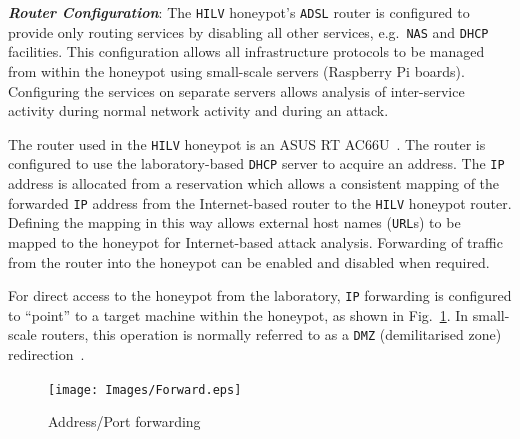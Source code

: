 \documentclass[10pt,journal]{IEEEtran}
\begin{document}
\noindent\textit{\textbf{Router Configuration}}:
The \texttt{HILV} honeypot's \texttt{ADSL} router is configured to provide only
routing services by disabling all other services, e.g.\ \texttt{NAS} and
\texttt{DHCP} facilities. This configuration allows all infrastructure
protocols to be managed from within the honeypot using small-scale servers
(Raspberry Pi boards). Configuring the services on separate
servers allows analysis of inter-service activity during normal network
activity and during an attack.

The router used in the \texttt{HILV} honeypot is an ASUS RT
AC66U~\cite{ASUS:17}. The router is configured to use the laboratory-based
\texttt{DHCP} server to acquire an  address. The \texttt{IP} address is
allocated from a reservation which allows a consistent mapping of the forwarded
\texttt{IP} address from the Internet-based router to the \texttt{HILV} honeypot
router. Defining the mapping in this way allows external host names
(\texttt{URL}s) to be mapped to the honeypot for Internet-based attack
analysis. Forwarding of traffic from the router into the honeypot
can be enabled and disabled when required.

For direct access to the honeypot from the laboratory, \texttt{IP} forwarding is
configured to  ``point'' to a target machine within the honeypot,
as shown in Fig.~\ref{fig:Forward}. In small-scale routers, this operation is
normally referred to as a \texttt{DMZ} (demilitarised zone) redirection~\cite{MB:01}.
\newline
\begin{figure}[h]
\begin{center}
	\texttt{[image: Images/Forward.eps]}
\caption{Address/Port forwarding}
\label{fig:Forward}
\end{center}
\end{figure}
\end{document}
